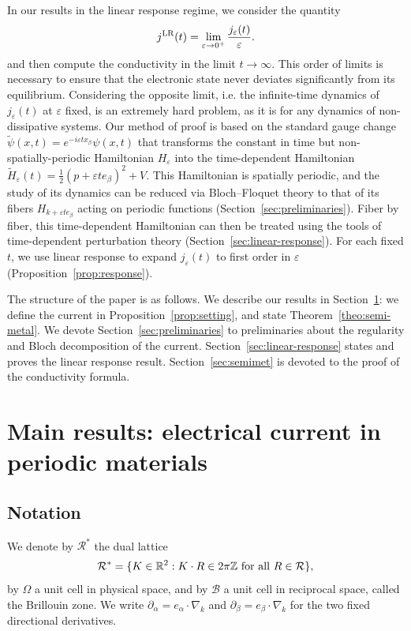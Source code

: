 \documentclass[a4paper,11pt]{article}
\theoremstyle{plain}
\theoremstyle{remark}
\def\R{{\mathbb R}}
\def\Z{{\mathbb Z}}
\def\eps{{\varepsilon}}
\def\cB{{\mathcal B}}
\def\cR{{\mathcal R}}
\begin{document}
In our results in the linear response regime, we consider the quantity
\begin{align*}
  j^{\rm LR}(t) = \lim_{\eps \to 0^+} \frac {j_\eps(t)}{\eps}.
\end{align*}
and then compute the conductivity in the limit $t \to \infty$. This
order of limits is necessary to ensure that the electronic state never
deviates significantly from its equilibrium. Considering the opposite
limit, i.e. the infinite-time dynamics of
$j_\eps(t)$ at $\eps$ fixed, is an extremely
hard problem, as it is for any dynamics of non-dissipative systems.
Our method of proof is based on the standard gauge change
$\widetilde\psi(x,t)=e^{-i\eps t x_\beta}\psi(x,t)$
that transforms the constant in time but non-spatially-periodic
Hamiltonian $H_\eps$ into the time-dependent Hamiltonian
$\widetilde H_\eps(t)=\frac12(p+\eps t e_\beta)^2+V$.
This Hamiltonian is spatially periodic, and the study of its dynamics
can be reduced via Bloch--Floquet theory to that of its fibers
$H_{k+\eps t e_\beta}$ acting on periodic functions
(Section~\ref{sec:preliminaries}). Fiber by fiber, this time-dependent
Hamiltonian can then be treated using the tools of time-dependent
perturbation theory (Section~\ref{sec:linear-response}). For each fixed $t$,
we use linear response to expand $j_\eps(t)$ to first order in $\eps$
(Proposition~\ref{prop:response}).


The structure of the paper is as follows. We describe our results in
Section~\ref{sec:results}: we define the current in
Proposition~\ref{prop:setting}, and state Theorem~\ref{theo:semi-metal}.
We devote Section~\ref{sec:preliminaries} to preliminaries about the
regularity and Bloch decomposition of the current.
Section~\ref{sec:linear-response} states and proves the linear response result.
Section~\ref{sec:semimet} is devoted to the proof of the conductivity
formula.

\section{Main results: electrical current in periodic materials}\label{sec:results}


\subsection{Notation}
\label{sec:notation}
We denote by $\cR^*$ the dual lattice
\[
\cR^*=\{K\in\R^2:K\cdot R\in2\pi\Z\hbox{ for all }R\in\cR\},
\]
by $\Omega$ a unit cell in physical space, and by $\cB$ a unit cell in
reciprocal space, called the Brillouin zone. We write
$\partial_\alpha=e_\alpha\cdot\nabla_k$ and
$\partial_\beta=e_\beta\cdot\nabla_k$ for the two fixed directional derivatives.
\end{document}
